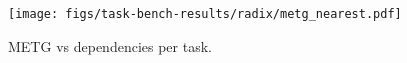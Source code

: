 \begin{figure}[t]
\centering
\texttt{[image: figs/task-bench-results/radix/metg\_nearest.pdf]}
\caption{METG vs dependencies per task.\label{fig:radix}}
\end{figure}
